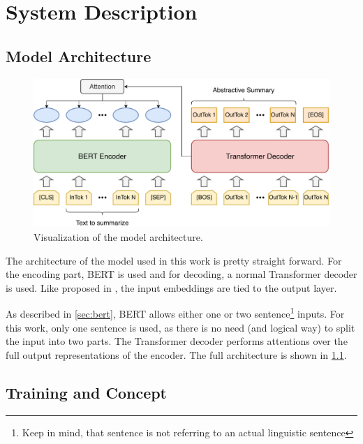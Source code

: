 \chapter{System Description}\label{ch:system-description}



\section{Model Architecture}
 
\begin{figure}[h]
\centering
\includegraphics[width=0.7\paperwidth]{figures/summarization-architecture}
\caption{Visualization of the model architecture.}
\label{fig:summarization-architecture}
\end{figure}

The architecture of the model used in this work is pretty straight forward.
For the encoding part, BERT is used and for decoding, a normal Transformer decoder is used.
Like proposed in \cite{1608.05859}, the input embeddings are tied to the output layer.

As described in \cref{sec:bert}, BERT allows either one or two sentence\footnote{Keep in mind, that sentence is not referring to an actual linguistic sentence} inputs.
For this work, only one sentence is used, as there is no need (and logical way) to split the input into two parts.
The Transformer decoder performs attentions over the full output representations of the encoder.
The full architecture is shown in \cref{fig:summarization-architecture}.


\section{Training and Concept}\label{sec:system-description-training}

